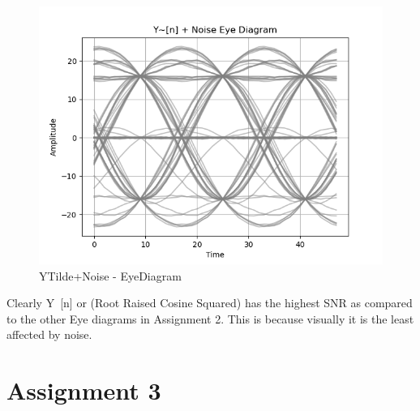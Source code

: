 \documentclass[
	letterpaper, %
	10pt, %
]{CSUniSchoolLabReport}
\begin{document}
\begin{figure}[H] %
	\centering %
	\includegraphics[width=1.2\textwidth]{assignment2c.png} %
	\caption{YTilde+Noise - EyeDiagram}
	\label{fig:block}
\end{figure}

Clearly Y~[n] or (Root Raised Cosine Squared) has the highest SNR as compared to the other Eye diagrams in Assignment 2. This is because visually it is the least affected by noise.

\section{Assignment 3}
\end{document}
